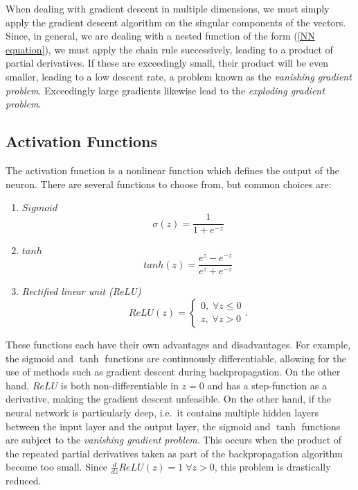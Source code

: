 \documentclass[10pt,a4paper]{book}
\begin{document}
When dealing with gradient descent in multiple dimensions, we must simply apply the gradient descent algorithm on the singular components of the vectors. Since, in general, we are dealing with a nested function of the form (\ref{NN equation}), we must apply the chain rule successively, leading to a product of partial derivatives. If these are exceedingly small, their product will be even smaller, leading to a low descent rate, a problem known as the \emph{vanishing gradient problem}. Exceedingly large gradients likewise lead to the \emph{exploding gradient problem}. 

\subsection{Activation Functions}
The activation function is a nonlinear function which defines the output of the neuron. There are several functions to choose from, but common choices are:
\begin{enumerate}
\item $Sigmoid$
\begin{equation*}
\sigma(z) = \frac{1}{1 + e^{-z}}
\end{equation*}
\item $tanh$
\begin{equation*}
tanh(z) = \frac{e^z - e^{-z}}{e^z + e^{-z}}
\end{equation*}
\item \emph{Rectified linear unit (ReLU)}
\begin{equation*}
ReLU(z) = \begin{cases}
0, \; \forall z \leq 0 \\
z, \; \forall z > 0
\end{cases}.
\end{equation*}
\end{enumerate} 
These functions each have their own advantages and disadvantages. For example, the sigmoid and $\tanh$ functions are continuously differentiable, allowing for the use of methods such as gradient descent during backpropagation. On the other hand, $ReLU$ is both non-differentiable in $z = 0$ and has a step-function as a derivative, making the gradient descent unfeasible. On the other hand, if the neural network is particularly deep, i.e.\ it contains multiple hidden layers between the input layer and the output layer, the sigmoid and $\tanh$ functions are subject to the \emph{vanishing gradient problem}. This occurs when the product of the repeated partial derivatives taken as part of the backpropagation algorithm become too small. Since $\frac{d}{dz}ReLU(z) = 1 \; \forall z > 0$, this problem is drastically reduced.
\end{document}
